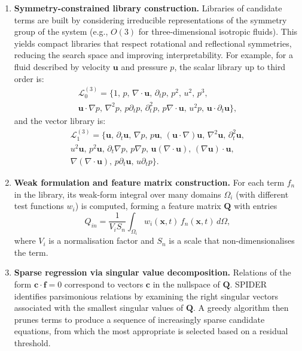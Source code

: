 \documentclass[preprint,12pt]{elsarticle}
\begin{document}
\begin{enumerate}
    \item \textbf{Symmetry-constrained library construction.} Libraries of candidate terms are built by considering irreducible representations of the symmetry group of the system (e.g., $O(3)$ for three-dimensional isotropic fluids). This yields compact libraries that respect rotational and reflectional symmetries, reducing the search space and improving interpretability. For example, for a fluid described by velocity $\mathbf{u}$ and pressure $p$, the scalar library up to third order is:
    \begin{multline}
    \label{eq:scalar-library}
    \mathcal{L}_0^{(3)} = \{1,\,p,\,\nabla\cdot\mathbf{u},\,\partial_t p,\,p^2,\,u^2,\,p^3,
    \\ \mathbf{u}\cdot\nabla p,\,\nabla^2 p,\,p\partial_t p,\,\partial_t^2 p,\,p\nabla\cdot\mathbf{u},\,u^2 p,\,\mathbf{u}\cdot\partial_t\mathbf{u}\},
    \end{multline}
    and the vector library is:
    \begin{multline}
    \label{eq:vector-library}
    \mathcal{L}_1^{(3)} = \{\mathbf{u},\,\partial_t\mathbf{u},\,\nabla p,\,p\mathbf{u},\,(\mathbf{u}\cdot\nabla)\mathbf{u},\,\nabla^2\mathbf{u},\,\partial_t^2\mathbf{u},
    \\ u^2\mathbf{u},\,p^2\mathbf{u},\,\partial_t\nabla p,\,p\nabla p,\,\mathbf{u}(\nabla\cdot\mathbf{u}),\,(\nabla\mathbf{u})\cdot\mathbf{u},
    \\ \nabla(\nabla\cdot\mathbf{u}),\,p\partial_t\mathbf{u},\,u\partial_t p\}.
    \end{multline}
    
    \item \textbf{Weak formulation and feature matrix construction.} For each term $f_n$ in the library, its weak-form integral over many domains $\Omega_i$ (with different test functions $w_i$) is computed, forming a feature matrix $\mathbf{Q}$ with entries
    \begin{equation}
    \label{eq:feature-matrix}
    Q_{in} = \frac{1}{V_i S_n}\int_{\Omega_i} w_i(\mathbf{x},t)\,f_n(\mathbf{x},t)\,d\Omega,
    \end{equation}
    where $V_i$ is a normalisation factor and $S_n$ is a scale that non-dimensionalises the term.
    
    \item \textbf{Sparse regression via singular value decomposition.} Relations of the form $\mathbf{c}\cdot\mathbf{f}=0$ correspond to vectors $\mathbf{c}$ in the nullspace of $\mathbf{Q}$. SPIDER identifies parsimonious relations by examining the right singular vectors associated with the smallest singular values of $\mathbf{Q}$. A greedy algorithm then prunes terms to produce a sequence of increasingly sparse candidate equations, from which the most appropriate is selected based on a residual threshold.
\end{enumerate}
\end{document}
